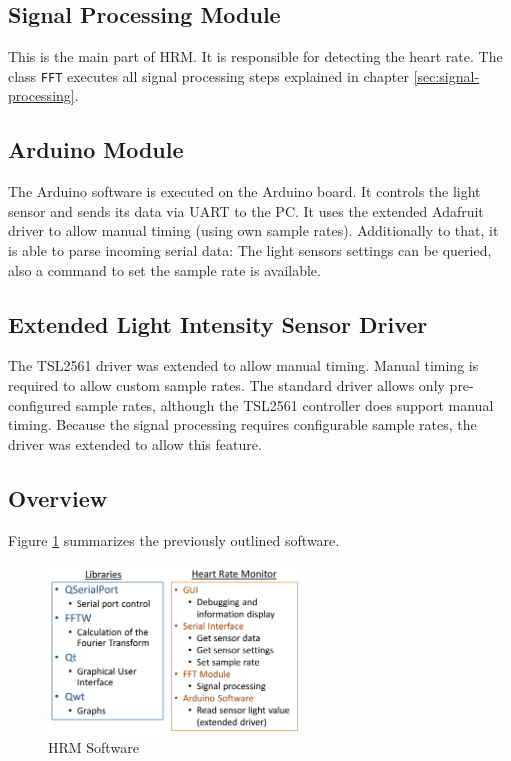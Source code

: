 \documentclass[notitlepage]{scrreprt}
\begin{document}
\subsection{Signal Processing Module}
This is the main part of HRM. It is responsible for detecting the heart rate. The class \lstinline{FFT} executes all signal processing steps explained in chapter \ref{sec:signal-processing}.

\subsection{Arduino Module}
The Arduino software is executed on the Arduino board. It controls the light sensor and sends its data via UART to the PC. It uses the extended Adafruit driver to allow manual timing (using own sample rates). Additionally to that, it is able to parse incoming serial data: The light sensors settings can be queried, also a command to set the sample rate is available.

\newpage

\subsection{Extended Light Intensity Sensor Driver}
The TSL2561 driver was extended to allow manual timing. Manual timing is required to allow custom sample rates. The standard driver allows only pre-configured sample rates, although the TSL2561 controller does support manual timing. Because the signal processing requires configurable sample rates, the driver was extended to allow this feature.\\

\subsection{Overview}
Figure \ref{fig:software} summarizes the previously outlined software.

\begin{figure}[H]
	\centering
	\includegraphics[width=250px]{images/software.png}
	\caption{HRM Software}
	\label{fig:software}
\end{figure}
\end{document}

